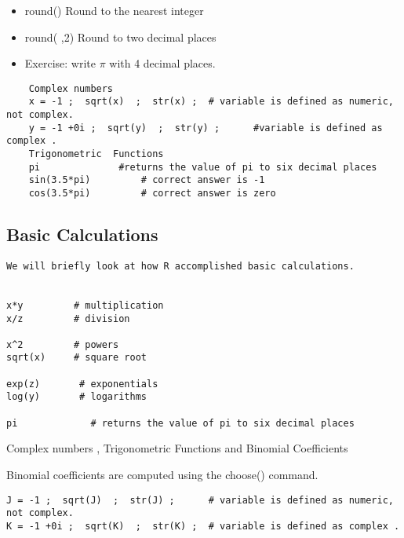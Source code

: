 \documentclass[a4paper,12pt]{article}
\begin{document}
\begin{itemize} 
\item round()      Round to the nearest integer
\item round( ,2)  Round to two decimal places
\end{itemize} 
 
\begin{itemize}
\item Exercise:  write $\pi$   with 4 decimal places.  
\end{itemize}

 
\begin{framed}
\begin{verbatim}
	Complex numbers
	x = -1 ;  sqrt(x)  ;  str(x) ; 	# variable is defined as numeric, not complex.
	y = -1 +0i ;  sqrt(y)  ;  str(y) ;    	#variable is defined as complex .
	Trigonometric  Functions
	pi				#returns the value of pi to six decimal places
	sin(3.5*pi)			# correct answer is -1
	cos(3.5*pi)			# correct answer is zero
\end{verbatim}
\end{framed}

\subsection{Basic Calculations}
\begin{verbatim}
We will briefly look at how R accomplished basic calculations.


x*y			# multiplication
x/z			# division

x^2			# powers
sqrt(x)		# square root

exp(z)		 # exponentials   
log(y)		 # logarithms

pi             # returns the value of pi to six decimal places

\end{verbatim}

Complex numbers , Trigonometric  Functions and Binomial Coefficients


Binomial coefficients are computed using the choose() command.



\begin{framed}
\begin{verbatim}
J = -1 ;  sqrt(J)  ;  str(J) ;      # variable is defined as numeric, not complex.
K = -1 +0i ;  sqrt(K)  ;  str(K) ;  # variable is defined as complex .


\end{verbatim}
\end{framed}
\end{document}
